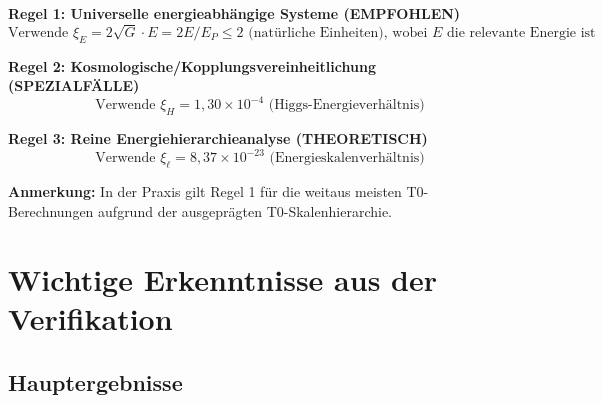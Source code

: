 	\begin{tcolorbox}[colback=blue!5!white,colframe=blue!75!black,title=Anwendungsregeln für $\xi$-Parameter (Reine Energie)]
		\textbf{Regel 1: Universelle energieabhängige Systeme (EMPFOHLEN)}
		\begin{equation}
			\text{Verwende } \xi_E = 2\sqrt{G} \cdot E = 2E/E_P \le 2 \text{ (natürliche Einheiten), wobei } E \text{ die relevante Energie ist}
		\end{equation}
		
		\textbf{Regel 2: Kosmologische/Kopplungsvereinheitlichung (SPEZIALFÄLLE)}
		\begin{equation}
			\text{Verwende } \xi_H = 1,30 \times 10^{-4} \text{ (Higgs-Energieverhältnis)}
		\end{equation}
		
		\textbf{Regel 3: Reine Energiehierarchieanalyse (THEORETISCH)}
		\begin{equation}
			\text{Verwende } \xi_\ell = 8,37 \times 10^{-23} \text{ (Energieskalenverhältnis)}
		\end{equation}
		
		\textbf{Anmerkung:} In der Praxis gilt Regel 1 für die weitaus meisten T0-Berechnungen aufgrund der ausgeprägten T0-Skalenhierarchie.
	\end{tcolorbox}
	
	\section{Wichtige Erkenntnisse aus der Verifikation}
	
	\subsection{Hauptergebnisse}
	
